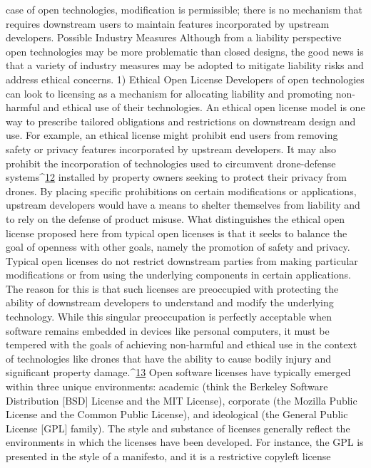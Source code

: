 case of open technologies, modification is permissible; there is no mechanism
that requires downstream users to maintain features incorporated by
upstream developers.
Possible Industry Measures
Although from a liability perspective open technologies may be more problematic
than closed designs, the good news is that a variety of industry measures
may be adopted to mitigate liability risks and address ethical concerns.
1) Ethical Open License
Developers of open technologies can look to licensing as a mechanism for
allocating liability and promoting non-harmful and ethical use of their technologies. An ethical open license model is one way to prescribe tailored
obligations and restrictions on downstream design and use. For example, an
ethical license might prohibit end users from removing safety or privacy
features incorporated by upstream developers. It may also prohibit the
incorporation of technologies used to circumvent drone-defense systems^{\href{#endnotes-cooper}{12}}
installed by property owners seeking to protect their privacy from drones.
By placing specific prohibitions on certain modifications or applications,
upstream developers would have a means to shelter themselves from liability
and to rely on the defense of product misuse.
What distinguishes the ethical open license proposed here from typical
open licenses is that it seeks to balance the goal of openness with other
goals, namely the promotion of safety and privacy. Typical open licenses do
not restrict downstream parties from making particular modifications or
from using the underlying components in certain applications. The reason for this is that such licenses are preoccupied with protecting the ability of
downstream developers to understand and modify the underlying technology.
While this singular preoccupation is perfectly acceptable when software
remains embedded in devices like personal computers, it must be
tempered with the goals of achieving non-harmful and ethical use in the
context of technologies like drones that have the ability to cause bodily
injury and significant property damage.^{\href{#endnotes-cooper}{13}}
Open software licenses have typically emerged within three unique environments:
academic (think the Berkeley Software Distribution [BSD]
License and the MIT License), corporate (the Mozilla Public License and
the Common Public License), and ideological (the General Public License
[GPL] family). The style and substance of licenses generally reflect the environments
in which the licenses have been developed. For instance, the GPL
is presented in the style of a manifesto, and it is a restrictive copyleft license
